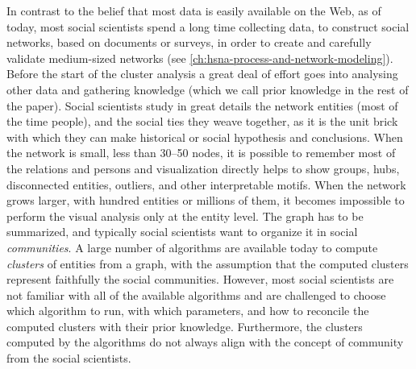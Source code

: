 In contrast to the belief that most data is easily available on the Web, as of today, most social scientists spend a long time collecting data, to construct social networks, based on documents or surveys, in order to create and carefully validate medium-sized networks (see \autoref{ch:hsna-process-and-network-modeling}).
Before the start of the cluster analysis a great deal of effort goes into analysing other data and gathering knowledge (which we call prior knowledge in the rest of the paper).
Social scientists study in great details the network entities (most of the time people), and the social ties they weave together, as it is the unit brick with which they can make historical or social hypothesis and conclusions.
When the network is small, less than 30--50 nodes, it is possible to remember most of the relations and persons and visualization directly helps to show groups, hubs, disconnected entities, outliers, and other interpretable motifs.
When the network grows larger, with hundred entities or millions of them, it becomes impossible to perform the visual analysis only at the entity level.
The graph has to be summarized, and typically social scientists want to organize it in social \emph{communities}.  A large number of algorithms are available today to compute \emph{clusters} of entities from a graph, with the assumption that the computed clusters represent faithfully the social communities.
However, most social scientists are not familiar with all of the available algorithms and are challenged to choose which algorithm to run, with which parameters, and how to reconcile the computed clusters with their prior knowledge. Furthermore, the clusters computed by the algorithms do not always align with the concept of community from the social scientists.


